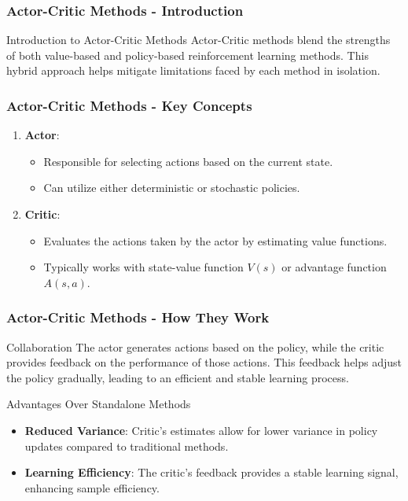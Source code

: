\documentclass[aspectratio=169]{beamer}
\begin{document}
\begin{frame}[fragile]
    \frametitle{Actor-Critic Methods - Introduction}
    \begin{block}{Introduction to Actor-Critic Methods}
        Actor-Critic methods blend the strengths of both value-based and policy-based reinforcement learning methods. 
        This hybrid approach helps mitigate limitations faced by each method in isolation.
    \end{block}
\end{frame}

\begin{frame}[fragile]
    \frametitle{Actor-Critic Methods - Key Concepts}
    \begin{enumerate}
        \item \textbf{Actor}:
            \begin{itemize}
                \item Responsible for selecting actions based on the current state.
                \item Can utilize either deterministic or stochastic policies.
            \end{itemize}
        \item \textbf{Critic}:
            \begin{itemize}
                \item Evaluates the actions taken by the actor by estimating value functions.
                \item Typically works with state-value function \( V(s) \) or advantage function \( A(s, a) \).
            \end{itemize}
    \end{enumerate}
\end{frame}

\begin{frame}[fragile]
    \frametitle{Actor-Critic Methods - How They Work}
    \begin{block}{Collaboration}
        The actor generates actions based on the policy, while the critic provides feedback on the performance of those actions. This feedback helps adjust the policy gradually, leading to an efficient and stable learning process.
    \end{block}

    \begin{block}{Advantages Over Standalone Methods}
        \begin{itemize}
            \item \textbf{Reduced Variance}: Critic's estimates allow for lower variance in policy updates compared to traditional methods.
            \item \textbf{Learning Efficiency}: The critic’s feedback provides a stable learning signal, enhancing sample efficiency.
        \end{itemize}
    \end{block}
\end{frame}
\end{document}
